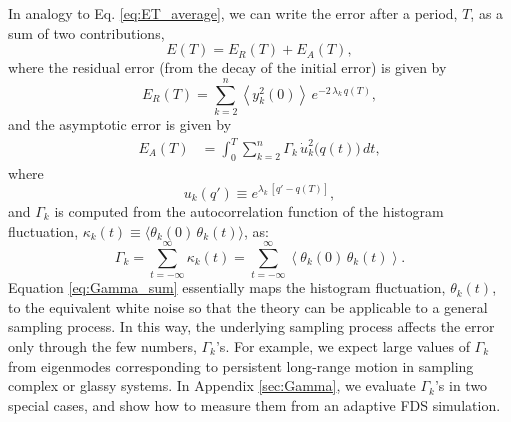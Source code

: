 \documentclass[reprint, superscriptaddress, floatfix]{revtex4-1}
\newcommand{\Err}{E}
\begin{document}
In analogy to Eq. \eqref{eq:ET_average},
we can write the error after a period, $T$,
as a sum of two contributions,
%
\begin{equation}
  \Err(T)
  =
  \Err_R(T) + \Err_A(T),
  \label{eq:error_tot}
\end{equation}
%
where the residual error
(from the decay of the initial error)
is given by
%
\begin{equation}
  \Err_R(T)
  =
  \sum_{k = 2}^n
    \left\langle y_k^2(0) \right\rangle \,
    e^{ - 2 \, \lambda_k  \, q(T) },
  \label{eq:error_res}
\end{equation}
%
and the asymptotic error
is given by
%
\begin{align}
  \Err_A(T)
  &=
  \int_0^T
  \sum_{k = 2}^n
  \Gamma_k \, \dot u_k^2\bigl( q(t) \bigr) \, dt
  ,
\label{eq:error_asym}
\end{align}
%
where
%
\begin{equation}
  u_k(q') \equiv e^{\lambda_k \, [q' - q(T)]}
  ,
  \label{eq:uk_def}
\end{equation}
%
and $\Gamma_k$ is computed from
the autocorrelation function
of the histogram fluctuation,
$\kappa_k(t) \equiv \langle \theta_k(0) \, \theta_k(t) \rangle$,
as:
%
\begin{equation}
  \Gamma_k
  = \sum_{t = -\infty}^\infty \kappa_k(t)
  = \sum_{t = -\infty}^\infty \left\langle \theta_k(0) \, \theta_k(t) \right\rangle
  .
  \label{eq:Gamma_sum}
\end{equation}
%
%
Equation \eqref{eq:Gamma_sum}
essentially maps the histogram fluctuation, $\theta_k(t)$,
to the equivalent white noise
so that the theory can be applicable to
a general sampling process.
%
In this way,
the underlying sampling process
affects the error only through the
few numbers, $\Gamma_k$'s.
%
For example, we expect large values of $\Gamma_k$
from eigenmodes corresponding to
persistent long-range motion
in sampling complex or glassy systems.
%
In Appendix \ref{sec:Gamma},
we evaluate $\Gamma_k$'s in two special cases,
and show how to measure them
from an adaptive FDS simulation.
%
%
\end{document}
